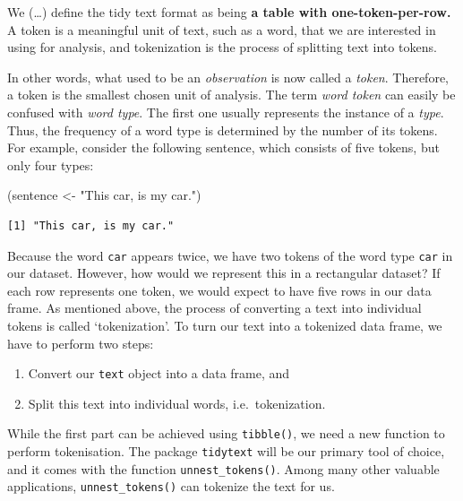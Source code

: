 \documentclass[
  letterpaper,
]{krantz}
\makeatletter
\newenvironment{Shaded}{\begin{snugshade}}{\end{snugshade}}
\newcommand{\NormalTok}[1]{\textcolor[rgb]{0.00,0.23,0.31}{#1}}
\newcommand{\OtherTok}[1]{\textcolor[rgb]{0.00,0.23,0.31}{#1}}
\newcommand{\StringTok}[1]{\textcolor[rgb]{0.13,0.47,0.30}{#1}}
\providecommand{\tightlist}{%
  \setlength{\itemsep}{0pt}\setlength{\parskip}{0pt}}\usepackage{longtable,booktabs,array}
\renewenvironment{quote}{\begin{VF}}{\end{VF}}
\newenvironment{kframe}{%
\medskip{}
\setlength{\fboxsep}{.8em}
 \def\at@end@of@kframe{}%
 \ifinner\ifhmode%
  \def\at@end@of@kframe{\end{minipage}}%
  \begin{minipage}{\columnwidth}%
 \fi\fi%
 \def\FrameCommand##1{\hskip\@totalleftmargin \hskip-\fboxsep
 \colorbox{shadecolor}{##1}\hskip-\fboxsep
     \hskip-\linewidth \hskip-\@totalleftmargin \hskip\columnwidth}%
 \MakeFramed {\advance\hsize-\width
   \@totalleftmargin\z@ \linewidth\hsize
   \@setminipage}}%
 {\par\unskip\endMakeFramed%
 \at@end@of@kframe}
\renewenvironment{Shaded}{\begin{kframe}}{\end{kframe}}
\makeatother
\begin{document}
\begin{quote}
We (\ldots) define the tidy text format as being \textbf{a table with
one-token-per-row.} A token is a meaningful unit of text, such as a
word, that we are interested in using for analysis, and tokenization is
the process of splitting text into tokens.
\end{quote}

In other words, what used to be an \emph{observation} is now called a
\emph{token}. Therefore, a token is the smallest chosen unit of
analysis. The term \emph{word token} can easily be confused with
\emph{word type}. The first one usually represents the instance of a
\emph{type}. Thus, the frequency of a word type is determined by the
number of its tokens. For example, consider the following sentence,
which consists of five tokens, but only four types:

\begin{Shaded}
\begin{Highlighting}[]
\NormalTok{(sentence }\OtherTok{\textless{}{-}} \StringTok{"This car, is my car."}\NormalTok{)}
\end{Highlighting}
\end{Shaded}

\begin{verbatim}
[1] "This car, is my car."
\end{verbatim}

Because the word \texttt{car} appears twice, we have two tokens of the
word type \texttt{car} in our dataset. However, how would we represent
this in a rectangular dataset? If each row represents one token, we
would expect to have five rows in our data frame. As mentioned above,
the process of converting a text into individual tokens is called
`tokenization'. To turn our text into a tokenized data frame, we have to
perform two steps:

\begin{enumerate}
\def\labelenumi{\arabic{enumi}.}
\tightlist
\item
  Convert our \texttt{text} object into a data frame, and
\item
  Split this text into individual words, i.e.~tokenization.
\end{enumerate}

While the first part can be achieved using \texttt{tibble()}, we need a
new function to perform tokenisation. The package \texttt{tidytext} will
be our primary tool of choice, and it comes with the function
\texttt{unnest\_tokens()}. Among many other valuable applications,
\texttt{unnest\_tokens()} can tokenize the text for us.
\end{document}
